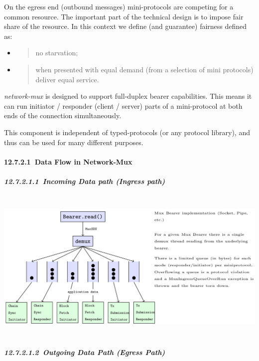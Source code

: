 \documentclass[]{article}
\let\oldparagraph\paragraph
\renewcommand{\paragraph}[1]{\oldparagraph{#1}\mbox{}}
\let\oldsubparagraph\subparagraph
\renewcommand{\subparagraph}[1]{\oldsubparagraph{#1}\mbox{}}
\begin{document}
On the egress end (outbound messages) mini-protocols are competing for a
common resource. The important part of the technical design is to impose
fair share of the resource. In this context we define (and guarantee)
fairness defined as:

\begin{itemize}
\item
  \begin{quote}
  no starvation;
  \end{quote}
\item
  \begin{quote}
  when presented with equal demand (from a selection of mini protocols)
  deliver equal service.
  \end{quote}
\end{itemize}

\emph{network-mux} is designed to support full-duplex bearer
capabilities. This means it can run initiator / responder (client /
server) parts of a mini-protocol at both ends of the connection
simultaneously.

This component is independent of typed-protocols (or any protocol
library), and thus can be used for many different purposes.

\hypertarget{data-flow-in-network-mux}{%
\paragraph{​12.7.2.1​~Data Flow in
Network-Mux}\label{data-flow-in-network-mux}}

\hypertarget{incoming-data-path-ingress-path}{%
\subparagraph{​12.7.2.1.1​~Incoming Data path (Ingress
path)}\label{incoming-data-path-ingress-path}}

\includegraphics[width=6.27083in,height=2.875in]{./media/image2.png}

\hypertarget{outgoing-data-path-egress-path}{%
\subparagraph{​12.7.2.1.2​~Outgoing Data Path (Egress
Path)}\label{outgoing-data-path-egress-path}}
\end{document}
